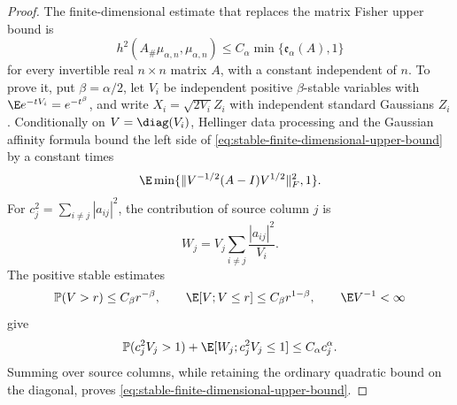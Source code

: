 \begin{proof}
The finite-dimensional estimate that replaces the matrix Fisher upper
bound is
\begin{equation}
 h^2(A_\#\mu_{\alpha,n},\mu_{\alpha,n})
 \le C_\alpha\min\{\mathfrak e_\alpha(A),1\}
 \label{eq:stable-finite-dimensional-upper-bound}
\end{equation}
for every invertible real \(n\times n\) matrix \(A\), with a constant
independent of \(n\).
To prove it, put \(\beta=\alpha/2\), let \(V_i\) be independent positive
\(\beta\)-stable variables with
\(\E e^{-tV_i}=e^{-t^\beta}\), and write
\(X_i=\sqrt{2V_i}Z_i\) with independent standard Gaussians \(Z_i\).
Conditionally on \(V=\diag(V_i)\), Hellinger data processing and the
Gaussian affinity formula bound the left side of
\eqref{eq:stable-finite-dimensional-upper-bound} by a constant times
\[
 \E\min\{\|V^{-1/2}(A-I)V^{1/2}\|_F^2,1\}.
\]
For \(c_j^2=\sum_{i\ne j}|a_{ij}|^2\), the contribution of source column
\(j\) is
\[
 W_j=V_j\sum_{i\ne j}\frac{|a_{ij}|^2}{V_i}.
\]
The positive stable estimates
\[
 \mathbb P(V>r)\le C_\beta r^{-\beta},
 \qquad
 \E[V;V\le r]\le C_\beta r^{1-\beta},
 \qquad
 \E V^{-1}<\infty
\]
give
\[
 \mathbb P(c_j^2V_j>1)
 +\E[W_j;c_j^2V_j\le1]
 \le C_\alpha c_j^\alpha.
\]
Summing over source columns, while retaining the ordinary quadratic bound
on the diagonal, proves \eqref{eq:stable-finite-dimensional-upper-bound}.


\end{proof}
